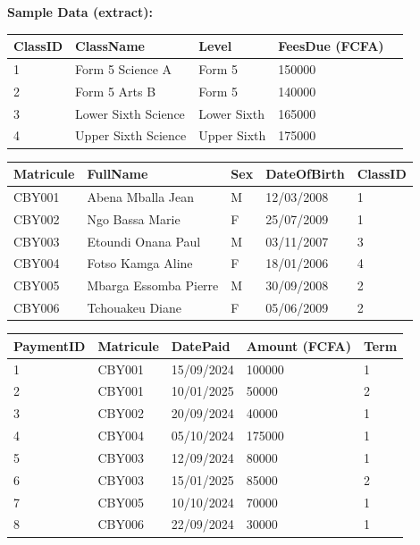 \documentclass[11pt]{article}
\begin{document}
\textbf{Sample Data (extract):}

\begin{center}
\begin{tabularx}{\linewidth}{|l|X|l|l|l|}
\hline
\rowcolor{popblueL} \textbf{ClassID} & \textbf{ClassName} & \textbf{Level} & \textbf{FeesDue (FCFA)} \\
\hline
1 & Form 5 Science A & Form 5 & 150000 \\
2 & Form 5 Arts B & Form 5 & 140000 \\
3 & Lower Sixth Science & Lower Sixth & 165000 \\
4 & Upper Sixth Science & Upper Sixth & 175000 \\
\hline
\end{tabularx}
\end{center}

\begin{center}
\begin{tabularx}{\linewidth}{|l|X|l|l|l|}
\hline
\rowcolor{popblueL} \textbf{Matricule} & \textbf{FullName} & \textbf{Sex} & \textbf{DateOfBirth} & \textbf{ClassID} \\
\hline
CBY001 & Abena Mballa Jean & M & 12/03/2008 & 1 \\
CBY002 & Ngo Bassa Marie & F & 25/07/2009 & 1 \\
CBY003 & Etoundi Onana Paul & M & 03/11/2007 & 3 \\
CBY004 & Fotso Kamga Aline & F & 18/01/2006 & 4 \\
CBY005 & Mbarga Essomba Pierre & M & 30/09/2008 & 2 \\
CBY006 & Tchouakeu Diane & F & 05/06/2009 & 2 \\
\hline
\end{tabularx}
\end{center}

\begin{center}
\begin{tabular}{|l|l|l|l|l|}
\hline
\rowcolor{popblueL} \textbf{PaymentID} & \textbf{Matricule} & \textbf{DatePaid} & \textbf{Amount (FCFA)} & \textbf{Term} \\
\hline
1 & CBY001 & 15/09/2024 & 100000 & 1 \\
2 & CBY001 & 10/01/2025 & 50000 & 2 \\
3 & CBY002 & 20/09/2024 & 40000 & 1 \\
4 & CBY004 & 05/10/2024 & 175000 & 1 \\
5 & CBY003 & 12/09/2024 & 80000 & 1 \\
6 & CBY003 & 15/01/2025 & 85000 & 2 \\
7 & CBY005 & 10/10/2024 & 70000 & 1 \\
8 & CBY006 & 22/09/2024 & 30000 & 1 \\
\hline
\end{tabular}
\end{center}
\end{document}
